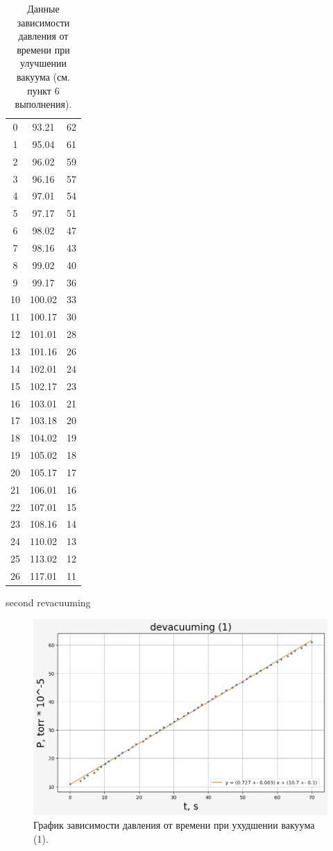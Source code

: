 \documentclass[a4paper,12pt]{article}
\begin{document}
\begin{table}[H]
\begin{minipage}[t]{.4\linewidth}
\begin{center}
\begin{tabular}{c|cc}
      \hline
      0&93.21&62\\
      1&95.04&61\\
      2&96.02&59\\
      3&96.16&57\\
      4&97.01&54\\
      5&97.17&51\\
      6&98.02&47\\
      7&98.16&43\\
      8&99.02&40\\
      9&99.17&36\\
      10&100.02&33\\
      11&100.17&30\\
      12&101.01&28\\
      13&101.16&26\\
      14&102.01&24\\
      15&102.17&23\\
      16&103.01&21\\
      17&103.18&20\\
      18&104.02&19\\
      19&105.02&18\\
      20&105.17&17\\
      21&106.01&16\\
      22&107.01&15\\
      23&108.16&14\\
      24&110.02&13\\
      25&113.02&12\\
      26&117.01&11\\
    \end{tabular}
    \end{center}
    \caption{second revacuuming\label{table:second revacuuming}}
  \end{minipage}
  \caption{Данные зависимости давления от времени при улучшении вакуума (см. пункт 6 выполнения).\label{table:3 and 4}}
  \end{table}
  
  \begin{figure} [H]
    \centering
    \includegraphics[scale=0.8]{plot1.png}
    \caption{График зависимости давления от времени при ухудшении вакуума (1).
  ~\label{plot:first_devacuuming}}
  \end{figure}
  
\end{document}
